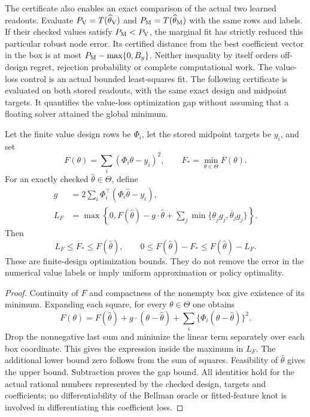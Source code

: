 The certificate also enables an exact comparison of the
actual two learned readouts.  Evaluate
\(P_{\rm V}=T(\widehat\theta_{\rm V})\) and
\(P_{\rm M}=T(\widehat\theta_{\rm M})\) with the same rows
and labels.  If their checked values satisfy
\(P_{\rm M}<P_{\rm V}\), the marginal fit has strictly
reduced this particular robust node error.
Its certified distance from the best coefficient vector in
the box is at most \(P_{\rm M}-\max\{0,B_y\}\).
Neither inequality by itself orders off-design regret,
rejection probability or complete computational work.
The value-loss control is an actual bounded least-squares
fit.  The following certificate is evaluated on both stored
readouts, with the same exact design and midpoint targets.
It quantifies the value-loss optimization gap without
assuming that a floating solver attained the global minimum.

\begin{proposition}
\label{prop:valueloss121}
Let the finite value design rows be \(\Phi_i\), let the
stored midpoint targets be \(y_i\), and set
\[
 F(\theta)=\sum_i(\Phi_i\theta-y_i)^2,
 \qquad F_* = \min_{\theta\in\Theta} F(\theta).
\]
For an exactly checked \(\widehat\theta\in\Theta\), define
\begin{align*}
 g&=2\sum_i\Phi_i^\top(\Phi_i\widehat\theta-y_i),\\
 L_F&=\max\left\{0,F(\widehat\theta)-g\cdot\widehat\theta
       +\sum_j\min\{\underline\theta_jg_j,
                              \overline\theta_jg_j\}\right\}.
\end{align*}
Then
\[
 L_F\leq F_*\leq F(\widehat\theta),\qquad
 0\leq F(\widehat\theta)-F_*\leq F(\widehat\theta)-L_F.
\]
These are finite-design optimization bounds.  They do not
remove the error in the numerical value labels or imply
uniform approximation or policy optimality.
\end{proposition}

\begin{proof}
Continuity of \(F\) and compactness of the nonempty box
give existence of its minimum.  Expanding each square,
for every \(\theta\in\Theta\) one obtains
\[
 F(\theta)=F(\widehat\theta)+g\cdot(\theta-\widehat\theta)
                 +\sum_i\{\Phi_i(\theta-\widehat\theta)\}^2.
\]
Drop the nonnegative last sum and minimize the linear
term separately over each box coordinate.  This gives
the expression inside the maximum in \(L_F\).
The additional lower bound zero follows from the sum
of squares.  Feasibility of \(\widehat\theta\) gives the
upper bound.  Subtraction proves the gap bound.
All identities hold for the actual rational numbers
represented by the checked design, targets and coefficients;
no differentiability of the Bellman oracle or fitted-feature
knot is involved in differentiating this coefficient loss.
\end{proof}

